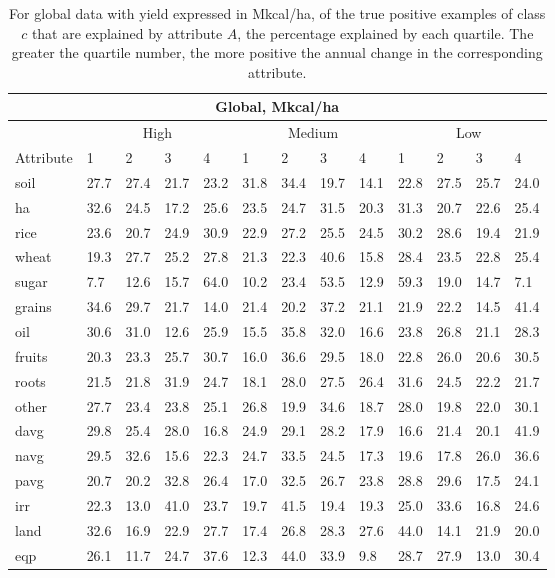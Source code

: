 \documentclass[12pt,twoside]{article}
\begin{document}
\begin{table}
\centering
\begin{tabular}{lllllllllllll}
\toprule
\multicolumn{13}{c}{\textbf{Global, Mkcal/ha}} \\
\midrule
& \multicolumn{4}{c}{High} & \multicolumn{4}{c}{Medium} & \multicolumn{4}{c}{Low} \\
\cmidrule(lr){2-5}
\cmidrule(lr){6-9}
\cmidrule(l){10-13}
Attribute & 1 & 2 & 3 & 4 & 1 & 2 & 3 & 4 & 1 & 2 & 3 & 4 \\
\midrule
soil & 27.7 & 27.4 & 21.7 & 23.2 & 31.8 & 34.4 & 19.7 & 14.1 & 22.8 & 27.5 & 25.7 & 24.0 \\
ha & 32.6 & 24.5 & 17.2 & 25.6 & 23.5 & 24.7 & 31.5 & 20.3 & 31.3 & 20.7 & 22.6 & 25.4 \\
rice & 23.6 & 20.7 & 24.9 & 30.9 & 22.9 & 27.2 & 25.5 & 24.5 & 30.2 & 28.6 & 19.4 & 21.9 \\
wheat & 19.3 & 27.7 & 25.2 & 27.8 & 21.3 & 22.3 & 40.6 & 15.8 & 28.4 & 23.5 & 22.8 & 25.4 \\
sugar & 7.7 & 12.6 & 15.7 & 64.0 & 10.2 & 23.4 & 53.5 & 12.9 & 59.3 & 19.0 & 14.7 & 7.1 \\
grains & 34.6 & 29.7 & 21.7 & 14.0 & 21.4 & 20.2 & 37.2 & 21.1 & 21.9 & 22.2 & 14.5 & 41.4 \\
oil & 30.6 & 31.0 & 12.6 & 25.9 & 15.5 & 35.8 & 32.0 & 16.6 & 23.8 & 26.8 & 21.1 & 28.3 \\
fruits & 20.3 & 23.3 & 25.7 & 30.7 & 16.0 & 36.6 & 29.5 & 18.0 & 22.8 & 26.0 & 20.6 & 30.5 \\
roots & 21.5 & 21.8 & 31.9 & 24.7 & 18.1 & 28.0 & 27.5 & 26.4 & 31.6 & 24.5 & 22.2 & 21.7 \\
other & 27.7 & 23.4 & 23.8 & 25.1 & 26.8 & 19.9 & 34.6 & 18.7 & 28.0 & 19.8 & 22.0 & 30.1 \\
davg & 29.8 & 25.4 & 28.0 & 16.8 & 24.9 & 29.1 & 28.2 & 17.9 & 16.6 & 21.4 & 20.1 & 41.9 \\
navg & 29.5 & 32.6 & 15.6 & 22.3 & 24.7 & 33.5 & 24.5 & 17.3 & 19.6 & 17.8 & 26.0 & 36.6 \\
pavg & 20.7 & 20.2 & 32.8 & 26.4 & 17.0 & 32.5 & 26.7 & 23.8 & 28.8 & 29.6 & 17.5 & 24.1 \\
irr & 22.3 & 13.0 & 41.0 & 23.7 & 19.7 & 41.5 & 19.4 & 19.3 & 25.0 & 33.6 & 16.8 & 24.6 \\
land & 32.6 & 16.9 & 22.9 & 27.7 & 17.4 & 26.8 & 28.3 & 27.6 & 44.0 & 14.1 & 21.9 & 20.0 \\
eqp & 26.1 & 11.7 & 24.7 & 37.6 & 12.3 & 44.0 & 33.9 & 9.8 & 28.7 & 27.9 & 13.0 & 30.4 \\
\bottomrule
\end{tabular}
\captionsetup{width=.7\textwidth}
\caption[Percentage of Examples Explained by Quartile (Global, Mkcal/ha)]{For global data with yield expressed in Mkcal/ha, of the true positive examples of class $c$ that are explained by attribute $A$, the percentage explained by each quartile. The greater the quartile number, the more positive the annual change in the corresponding attribute.}
\label{k.ny.wt.quartiles}
\end{table}
\end{document}
